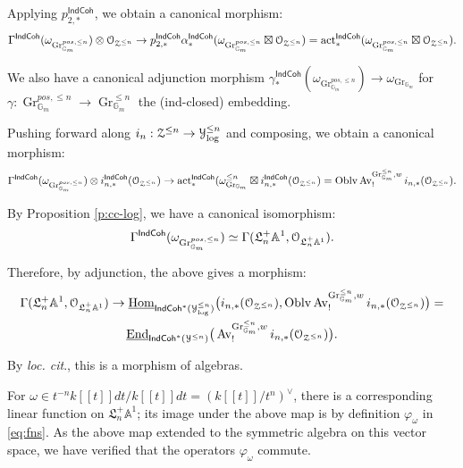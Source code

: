 \documentclass[reqno,11pt]{amsart}
\numberwithin{equation}{subsection}
\theoremstyle{remark}
\newcommand{\bA}{{\mathbb A}}
\newcommand{\bG}{{\mathbb G}}
\newcommand{\sO}{{\EuScript O}}
\newcommand{\sY}{{\EuScript Y}}
\newcommand{\sZ}{{\EuScript Z}}
\newcommand{\fL}{{\mathfrak L}}
\newcommand{\on}{\operatorname}
\newcommand{\ul}{\underline}
\newcommand{\End}{\on{End}}
\newcommand{\Hom}{\on{Hom}}
\newcommand{\act}{\on{act}}
\newcommand{\vph}{\varphi}
\newcommand{\Gr}{\on{Gr}}
\newcommand{\Oblv}{\on{Oblv}}
\newcommand{\Av}{\on{Av}}
\newcommand{\IndCoh}{\mathsf{IndCoh}}
\begin{document}
\noindent Applying $p_{2,*}^{\IndCoh}$, we obtain a canonical
morphism:
%
\[
\Gamma^{\IndCoh}(\omega_{\Gr_{\bG_m}^{pos,\leq n}}) \otimes  
\sO_{\sZ^{\leq n}} \to 
p_{2,*}^{\IndCoh}
\alpha_*^{\IndCoh}(\omega_{\Gr_{\bG_m}^{pos,\leq n}} \boxtimes 
\sO_{\sZ^{\leq n}}) = 
\act_*^{\IndCoh}(\omega_{\Gr_{\bG_m}^{pos,\leq n}} \boxtimes 
\sO_{\sZ^{\leq n}}).
\]

We also have a canonical adjunction morphism
$\gamma_*^{\IndCoh}(\omega_{\Gr_{\bG_m}^{pos,\leq n}}) \to 
\omega_{\Gr_{\bG_m}}$ for $\gamma:\Gr_{\bG_m}^{pos,\leq n} \to 
\Gr_{\bG_m}^{\leq n}$ the (ind-closed) embedding.

Pushing forward along $i_n:\sZ^{\leq n} \to \sY_{\log}^{\leq n}$
and composing, we obtain a canonical morphism:
%
\[
\Gamma^{\IndCoh}(\omega_{\Gr_{\bG_m}^{pos,\leq n}}) \otimes  
i_{n,*}^{\IndCoh}(\sO_{\sZ^{\leq n}}) \to 
\act_*^{\IndCoh}(\omega_{\Gr_{\bG_m}}^{\leq n} \boxtimes 
i_{n,*}^{\IndCoh}(\sO_{\sZ^{\leq n}}) = 
\Oblv \Av_!^{\Gr_{\bG_m}^{\leq n},w} 
i_{n,*}(\sO_{\sZ^{\leq n}}).
\]


By Proposition \ref{p:cc-log}, we have a canonical isomorphism:
%
\[
\Gamma^{\IndCoh}(\omega_{\Gr_{\bG_m}^{pos,\leq n}}) \simeq
\Gamma(\fL_n^+ \bA^1,\sO_{\fL_n^+ \bA^1}).
\]

\noindent Therefore, by adjunction, the above gives a morphism:
%
\[
\begin{gathered}
\Gamma(\fL_n^+ \bA^1,\sO_{\fL_n^+ \bA^1}) \to 
\ul{\Hom}_{\IndCoh^*(\sY_{\log}^{\leq n})}
\big(i_{n,*}(\sO_{\sZ^{\leq n}}),
\Oblv\Av_!^{\Gr_{\bG_m}^{\leq n},w}  i_{n,*}(\sO_{\sZ^{\leq n}})\big) = \\
\ul{\End}_{\IndCoh^*(\sY^{\leq n})}
\big(\Av_!^{\Gr_{\bG_m}^{\leq n},w}  i_{n,*}(\sO_{\sZ^{\leq n}})\big).
\end{gathered}
\]

\noindent By \emph{loc. cit}., this is a morphism
of algebras. 

For $\omega \in t^{-n}k[[t]]dt/k[[t]]dt = (k[[t]]/t^n)^{\vee}$,
there is a corresponding linear function on $\fL_n^+ \bA^1$;
its image under the above map is by definition $\vph_{\omega}$ in 
\eqref{eq:fns}. As the above map extended to the symmetric
algebra on this vector space, we have verified that
the operators $\vph_{\omega}$ commute.
\end{document}
